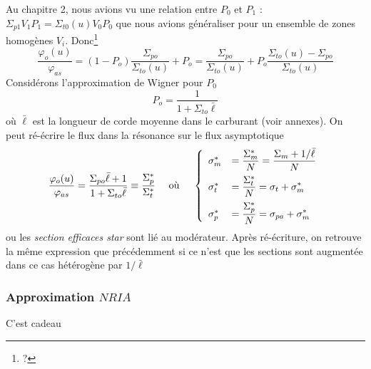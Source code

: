 	Au chapitre 2, nous avions vu une relation entre $P_0$ et $P_1$ : $\Sigma_{p1}V_1P_1 = 
	\Sigma_{t0}(u)V_0P_0$ que nous avions généraliser pour un ensemble de zones homogènes $V_i$.
	Donc\footnote{?}
	\begin{equation}
	\frac{{{\varphi _o}(u)}}{{{\varphi _{as}}}} = (1 - {P_o})\frac{{{\Sigma _{po}}}}{{{\Sigma _{to}}
	(u)}} + {P_o} = \frac{{{\Sigma _{po}}}}{{{\Sigma _{to}}(u)}} + {P_o}\frac{{{\Sigma _{to}}(u) -
	 {\Sigma _{po}}}}{{{\Sigma _{to}}(u)}}
	\end{equation}
	Considérons l'approximation de Wigner pour $P_0$
	\begin{equation}
	{P_o} = \frac{1}{{1 + {\Sigma _{to}}\bar \ell }}
	\end{equation}
	où $\bar \ell$ est la longueur de corde moyenne dans le carburant (voir annexes). On peut 
	ré-écrire le flux dans la résonance sur le flux asymptotique
	\begin{equation}
	\frac{{{\varphi _o}(u)}}{{{\varphi _{as}}}} = \frac{{{\Sigma _{po}}\bar \ell  + 1}}{{1 + {\Sigma
	 _{to}}\bar \ell }} \equiv \frac{{\Sigma _p^*}}{{\Sigma _t^*}}\quad\text{ où }\quad\left\{
	 \begin{array}{ll}
	\sigma _m^* &\DS= \frac{{\Sigma _m^*}}{N} = \frac{{{\Sigma _m} + 1/\bar \ell }}{N}\vspace{2mm}\\
	\sigma _t^* &\DS= \frac{{\Sigma _t^*}}{N} = {\sigma _t} + \sigma _m^*\vspace{2mm}\\
	\sigma _p^* &\DS= \frac{{\Sigma _p^*}}{N} = {\sigma _{pa}} + \sigma _m^*
	 \end{array}\right.
	\end{equation}
	ou les \textit{section efficaces star} sont lié au modérateur. Après ré-écriture, on retrouve 
	la même expression que précédemment si ce n'est que les sections sont augmentée dans ce cas
	hétérogène par $1/\bar\ell$\\
	
	
	\subsubsection{Approximation $NRIA$}
	C'est cadeau \\
	

